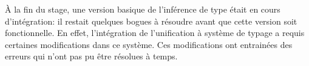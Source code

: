         \`A la fin du stage, une version basique de l'inférence de type était en cours d'intégration: il restait quelques bogues à résoudre avant que
        cette version soit fonctionnelle. En effet, l'intégration de l'unification à système de typage a requis certaines modifications dans
        ce système. Ces modifications ont entrainées des erreurs qui n'ont pas pu être résolues à temps.
